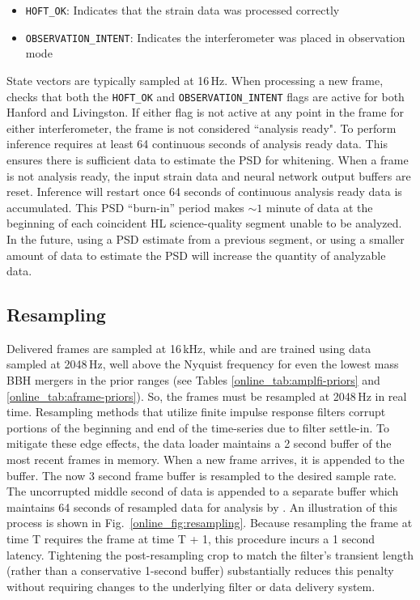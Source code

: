 \begin{refsection}
\begin{itemize}
    \item \texttt{HOFT\_OK}: Indicates that the strain data was processed correctly
    \item \texttt{OBSERVATION\_INTENT}: Indicates the interferometer was placed in observation mode
\end{itemize}


State vectors are typically sampled at 16\,Hz. 
When processing a new frame, \aframe checks that both the \texttt{HOFT\_OK} and \texttt{OBSERVATION\_INTENT} flags are active for both Hanford and Livingston. 
If either flag is not active at any point in the frame for either interferometer, the frame is not considered ``analysis ready". 
To perform inference \aframe requires at least 64 continuous seconds of analysis ready data. 
This ensures there is sufficient data to estimate the PSD for whitening. 
When a frame is not analysis ready, the input strain data and neural network output buffers are reset. 
Inference will restart once 64 seconds of continuous analysis ready data is accumulated.
This PSD ``burn-in'' period makes $\sim 1$ minute of data at the beginning of each coincident HL science-quality segment unable to be analyzed. 
In the future, using a PSD estimate from a previous segment, or using a smaller amount of data to estimate the PSD will increase the quantity of analyzable data. 

\subsection{Resampling}
Delivered frames are sampled at 16\,kHz, while \aframe and \amplfi are trained using data sampled at 2048\,Hz, well above the Nyquist frequency for even the lowest mass BBH mergers in the prior ranges (see Tables \ref{online_tab:amplfi-priors} and \ref{online_tab:aframe-priors}). 
So, the frames must be resampled at 2048\,Hz in real time. 
Resampling methods that utilize finite impulse response filters corrupt portions of the beginning and end of the time-series due to filter settle-in. 
To mitigate these edge effects, the \aframe data loader maintains a 2 second buffer of the most recent frames in memory. 
When a new frame arrives, it is appended to the buffer. The now 3 second frame buffer is resampled to the desired sample rate. 
The uncorrupted middle second of data is appended to a separate buffer which maintains 64 seconds of resampled data for analysis by \aframe. 
An illustration of this process is shown in Fig.~\ref{online_fig:resampling}. 
Because resampling the frame at time T requires the frame at time T + 1, this procedure incurs a 1 second latency.
Tightening the post-resampling crop to match the filter's transient length (rather than a conservative 1-second buffer) substantially reduces this penalty without requiring changes to the underlying filter or data delivery system. 


\end{refsection}
